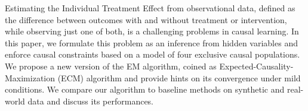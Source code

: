 
Estimating the Individual Treatment Effect from observational data, defined as the difference between outcomes with and without treatment or intervention, while observing just one of both, is a challenging problems in causal learning.
In this paper, we formulate this problem as an inference from hidden variables and enforce causal constraints based on a model of four exclusive causal populations. We propose a new version of the EM algorithm, coined as Expected-Causality-Maximization (ECM) algorithm and provide hints on its convergence under mild conditions. We compare our algorithm to baseline methods on synthetic and real-world data and discuss its performances. 




